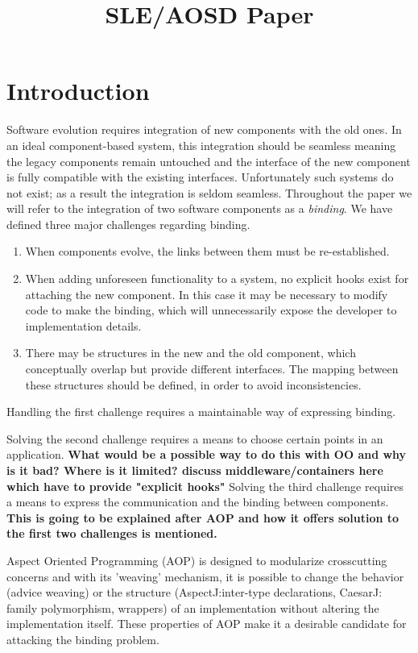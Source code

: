 \documentclass{llncs}
\begin{document}
\title{SLE/AOSD Paper}
\maketitle
\section{Introduction}
Software evolution requires integration of new components with the old ones. In an
ideal component-based system, this integration should be seamless meaning 
 the legacy components remain untouched and the interface of the new component is fully compatible with the existing interfaces. 
Unfortunately such systems do not exist; as a result the integration is seldom
seamless.  Throughout the paper we will refer to the integration of two software components as a
\emph{binding}. We have defined three major challenges regarding binding. 

\begin{enumerate}
  	\item When components evolve, the links between them
	must be re-established. 
 	 \item When adding unforeseen functionality to a system, no explicit hooks
 	 exist for attaching the new component. In this case it may be necessary
  	to modify code to make the binding, which will unnecessarily expose the
  	developer to implementation details.
	\item There may be structures in the new and the old component, which
	conceptually overlap but provide different interfaces. 	The mapping between
	these structures should be defined, in order to avoid inconsistencies.
\end{enumerate}

Handling the first challenge requires a maintainable way of expressing binding. 

Solving the second challenge requires a means to choose certain points in an
application. \textbf{What would be a possible way to do this with OO and why is
it bad? Where is it limited? discuss middleware/containers here which have to provide
"explicit hooks"}
Solving the third challenge requires a means to express the communication and
the binding between components. \textbf{This is going to be explained after AOP
and how it offers solution to the first two challenges is mentioned.}

Aspect Oriented Programming (AOP) is designed to modularize crosscutting
concerns and with its 'weaving' mechanism, it is possible to change the behavior
(advice weaving) or the structure (AspectJ:inter-type declarations, CaesarJ:
family polymorphism, wrappers) of an implementation without altering the
implementation itself. These properties of AOP make it a desirable candidate for
attacking the binding problem.
\end{document}

